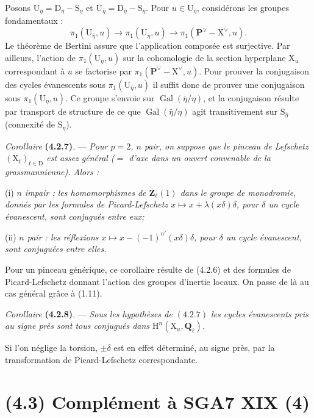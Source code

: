 \documentclass[11pt,leqno]{article}
\begin{document}
Posons \(\mathrm{U}_\eta=\mathrm{D}_\eta-\mathrm{S}_\eta\) et \(\mathrm{U}_{\bar\eta}=\mathrm{D}_{\bar\eta}-\mathrm{S}_{\bar\eta}\). Pour \(u\in\mathrm{U}_{\bar\eta}\), considérons les groupes fondamentaux :
\[
\pi_1(\mathrm{U}_{\bar\eta},u)
\to\pi_1(\mathrm{U}_\eta,u)
\to\pi_1(\mathbf{P}^{\vee}-\mathrm{X}^{\vee},u).
\]
Le théorème de Bertini assure que l’application composée est surjective. Par ailleurs, l’action de \(\pi_1(\mathrm{U}_{\bar\eta},u)\) sur la cohomologie de la section hyperplane \(\mathrm{X}_u\) correspondant à \(u\) se factorise par \(\pi_1(\mathbf{P}^{\vee}-\mathrm{X}^{\vee},u)\). Pour prouver la conjugaison des cycles évanescents sous \(\pi_1(\mathrm{U}_{\bar\eta},u)\) il suffit donc de prouver une conjugaison sous \(\pi_1(\mathrm{U}_\eta,u)\). Ce groupe s’envoie sur \(\operatorname{Gal}(\bar\eta/\eta)\), et la conjugaison résulte par transport de structure de ce que \(\operatorname{Gal}(\bar\eta/\eta)\) agit transitivement sur \(\mathrm{S}_{\bar\eta}\) (connexité de \(\mathrm{S}_\eta\)).

\textit{Corollaire} \textbf{(4.2.7)}. — \textit{Pour \(p=2\), \(n\) pair, on suppose que le pinceau de Lefschetz \((\mathrm{X}_t)_{t\in\mathrm{D}}\) est assez général (\(=\) d’axe dans un ouvert convenable de la grassmannienne). Alors :}

(i) \textit{\(n\) impair : les homomorphismes de \(\mathbf{Z}_\ell(1)\) dans le groupe de monodromie, donnés par les formules de Picard-Lefschetz \(x\mapsto x+\lambda(x\delta)\delta\), pour \(\delta\) un cycle évanescent, sont conjugués entre eux;}

(ii) \textit{\(n\) pair : les réflexions \(x\mapsto x-(-1)^{n'}(x\delta)\delta\), pour \(\delta\) un cycle évanescent, sont conjuguées entre elles.}

Pour un pinceau générique, ce corollaire résulte de (4.2.6) et des formules de Picard-Lefschetz donnant l’action des groupes d’inertie locaux. On passe de là au cas général grâce à (1.11).

\textit{Corollaire} \textbf{(4.2.8)}. — \textit{Sous les hypothèses de \((4.2.7)\) les cycles évanescents pris au signe près sont tous conjugués dans \(\mathrm{H}^n(\mathrm{X}_u,\mathbf{Q}_\ell)\).}

Si l’on néglige la torsion, \(\pm\delta\) est en effet déterminé, au signe près, par la transformation de Picard-Lefschetz correspondante.

\section*{(4.3) Complément à SGA7 XIX (4)}
\end{document}

